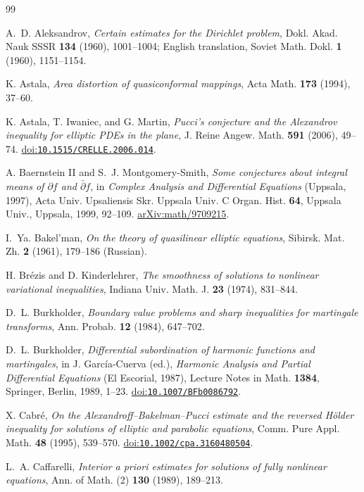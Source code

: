 \documentclass[11pt,a4paper,reqno]{amsart}
\theoremstyle{plain}
\theoremstyle{remark}
\numberwithin{equation}{section}
\newcommand{\doi}[1]{\href{https://doi.org/#1}{doi:\nolinkurl{#1}}}
\begin{document}
\begin{thebibliography}{99}

A.~D. Aleksandrov,
\emph{Certain estimates for the Dirichlet problem},
Dokl. Akad. Nauk SSSR \textbf{134} (1960), 1001--1004;
English translation, Soviet Math. Dokl. \textbf{1} (1960), 1151--1154.

K. Astala,
\emph{Area distortion of quasiconformal mappings},
Acta Math. \textbf{173} (1994), 37--60.

K. Astala, T. Iwaniec, and G. Martin,
\emph{Pucci's conjecture and the Alexandrov inequality for elliptic PDEs in the plane},
J. Reine Angew. Math. \textbf{591} (2006), 49--74.
\doi{10.1515/CRELLE.2006.014}.

A. Baernstein II and S.~J. Montgomery-Smith,
\emph{Some conjectures about integral means of $\partial f$ and $\bar\partial f$},
in \emph{Complex Analysis and Differential Equations} (Uppsala, 1997),
Acta Univ. Upsaliensis Skr. Uppsala Univ. C Organ. Hist. \textbf{64},
Uppsala Univ., Uppsala, 1999, 92--109.
\href{https://arxiv.org/abs/math/9709215}{arXiv:math/9709215}.

I.~Ya. Bakel'man,
\emph{On the theory of quasilinear elliptic equations},
Sibirsk. Mat. Zh. \textbf{2} (1961), 179--186 (Russian).

H. Br\'ezis and D. Kinderlehrer,
\emph{The smoothness of solutions to nonlinear variational inequalities},
Indiana Univ. Math. J. \textbf{23} (1974), 831--844.

D.~L. Burkholder,
\emph{Boundary value problems and sharp inequalities for martingale transforms},
Ann. Probab. \textbf{12} (1984), 647--702.

D.~L. Burkholder,
\emph{Differential subordination of harmonic functions and martingales},
in J. Garc\'ia-Cuerva (ed.), \emph{Harmonic Analysis and Partial Differential Equations}
(El Escorial, 1987), Lecture Notes in Math. \textbf{1384}, Springer, Berlin, 1989, 1--23.
\doi{10.1007/BFb0086792}.

X. Cabr\'e,
\emph{On the Alexandroff--Bakelman--Pucci estimate and the reversed H\"older inequality for solutions of elliptic and parabolic equations},
Comm. Pure Appl. Math. \textbf{48} (1995), 539--570.
\doi{10.1002/cpa.3160480504}.

L.~A. Caffarelli,
\emph{Interior a priori estimates for solutions of fully nonlinear equations},
Ann. of Math. (2) \textbf{130} (1989), 189--213.


\end{thebibliography}
\end{document}
